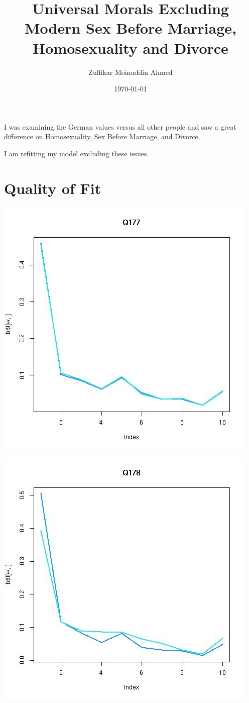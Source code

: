 \documentclass{amsart}
\title{Universal Morals Excluding Modern Sex Before Marriage, Homosexuality and Divorce}
\author{Zulfikar Moinuddin Ahmed}
\date{\today}
\begin{document}
\maketitle

I was examining the German values versus all other people and saw a great difference on Homosexuality, Sex Before Marriage, and Divorce.

I am refitting my model excluding these issues.

\section{Quality of Fit}

\includegraphics[scale=0.6]{fitQ177.jpeg}

\includegraphics[scale=0.6]{fitQ178.jpeg}
\end{document}
